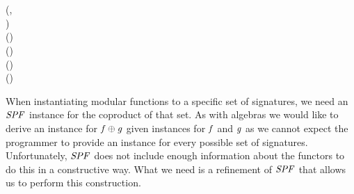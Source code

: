 \begin{hscode}\SaveRestoreHook
{}%
%
%
%
%
%
%
%
%
%
\>[3]{}\;\;\;\;\;\;\<[E]%
\\
\>[3]{}\<[5]%
\>[5]{}\mathbin{::}\;\;\;\;\<[E]%
\\[\blanklineskip]%
\>[3]{}\;{}\<[13]%
\>[13]{}(\;\;\;\;,{}\<[E]%
\\
\>[13]{}\<[14]%
\>[14]{}\;\;\;\;)\Rightarrow {}\<[E]%
\\
\>[3]{}\<[7]%
\>[7]{}\;(\oplus{})\;\;{}\<[E]%
\\
\>[7]{}\<[9]%
\>[9]{}(\;\;)\;\;\<[E]%
\\
\>[3]{}\<[6]%
\>[6]{}\;(\;)\;{}\<[25]%
\>[25]{}\mathrel{=}\;\;\<[E]%
\\
\>[3]{}\<[6]%
\>[6]{}\;(\;)\;{}\<[25]%
\>[25]{}\mathrel{=}\;\;\<[E]%
\ColumnHook
\end{hscode}\resethooks
When instantiating modular functions to a specific set of signatures,
we need an \ensuremath{\Conid{SPF}} instance for the coproduct of that set. As with
algebras we would like to derive an instance for \ensuremath{\Varid{f}\oplus\Varid{g}} given
instances for \ensuremath{\Varid{f}} and \ensuremath{\Varid{g}} as we cannot expect the programmer to
provide an instance for every possible set of
signatures. Unfortunately, \ensuremath{\Conid{SPF}} does not include enough information
about the functors to do this in a constructive way. What we need is a
refinement of \ensuremath{\Conid{SPF}} that allows us to perform this construction.

